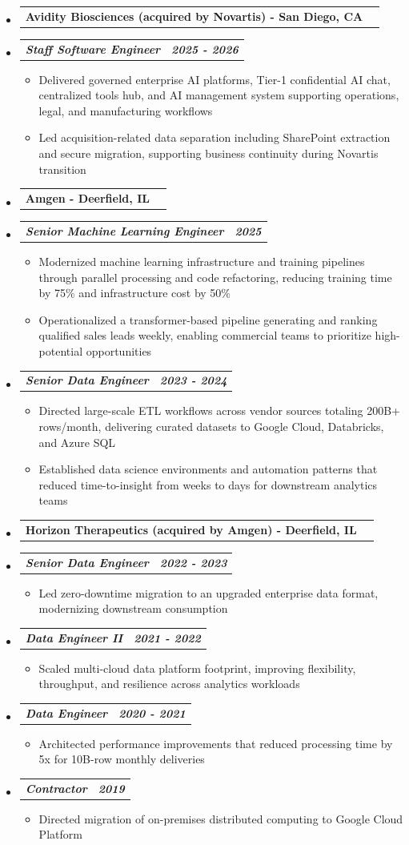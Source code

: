 \documentclass[letterpaper,11pt]{article}
\makeatletter
\newcommand{\resumeItem}[1]{
  \item\small{
    {#1 \vspace{0pt}}
  }
}
\newcommand{\resumeSubheading}[2]{
  \vspace{-1pt}\item
    \begin{tabular*}{0.97\textwidth}[t]{l@{\extracolsep{\fill}}r}
      \textbf{\small#1 - \small#2}
    \end{tabular*}\vspace{-4pt}
}
\newcommand{\resumeSubSubheading}[2]{
    \item
    \vspace{0pt}
    \begin{tabular*}{0.97\textwidth}{l@{\extracolsep{\fill}}r}
      \textbf{\textit{\small#1}} & \textbf{\textit{\small#2}} \\
    \end{tabular*}\vspace{-7pt}
}
\newcommand{\resumeHeadingListStart}{\begin{itemize}[leftmargin=0.05in, label={}, itemsep=0pt, topsep=0pt]}
\newcommand{\resumeHeadingListEnd}{\end{itemize}}
\newcommand{\resumeSubHeadingListStart}{\begin{itemize}[leftmargin=0.15in, label={}, itemsep=0pt, topsep=0pt]}
\newcommand{\resumeSubHeadingListEnd}{\end{itemize}\vspace{0pt}}
\newcommand{\resumeItemListStart}{\begin{itemize}[leftmargin=0.15in, itemsep=0pt, topsep=0pt]}
\newcommand{\resumeItemListEnd}{\end{itemize}\vspace{-4pt}}
\makeatother
\begin{document}
    \resumeHeadingListStart
        \resumeSubheading{Avidity Biosciences (acquired by Novartis)}{San Diego, CA}
    \resumeHeadingListEnd
        \resumeSubHeadingListStart
            \resumeSubSubheading {Staff Software Engineer}{2025 - 2026}
            \resumeItemListStart
                \resumeItem{Delivered governed enterprise AI platforms, Tier-1 confidential AI chat, centralized tools hub, and AI management system supporting operations, legal, and manufacturing workflows}
                \resumeItem{Led acquisition-related data separation including SharePoint extraction and secure migration, supporting business continuity during Novartis transition}
            \resumeItemListEnd
        \resumeSubHeadingListEnd

    \resumeHeadingListStart
        \resumeSubheading{Amgen}{Deerfield, IL}
    \resumeHeadingListEnd
        \resumeSubHeadingListStart
            \resumeSubSubheading {Senior Machine Learning Engineer}{2025}
            \resumeItemListStart
                \resumeItem{Modernized machine learning infrastructure and training pipelines through parallel processing and code refactoring, reducing training time by 75\% and infrastructure cost by 50\%}
                \resumeItem{Operationalized a transformer-based pipeline generating and ranking qualified sales leads weekly, enabling commercial teams to prioritize high-potential opportunities}
            \resumeItemListEnd
        \resumeSubHeadingListEnd

        \resumeSubHeadingListStart
            \resumeSubSubheading {Senior Data Engineer}{2023 - 2024}
            \resumeItemListStart
                \resumeItem{Directed large-scale ETL workflows across vendor sources totaling 200B+ rows/month, delivering curated datasets to Google Cloud, Databricks, and Azure SQL}
                \resumeItem{Established data science environments and automation patterns that reduced time-to-insight from weeks to days for downstream analytics teams}
            \resumeItemListEnd
        \resumeSubHeadingListEnd
    \resumeHeadingListStart
        \resumeSubheading{Horizon Therapeutics (acquired by Amgen)}{Deerfield, IL}
    \resumeHeadingListEnd
        \resumeSubHeadingListStart
            \resumeSubSubheading {Senior Data Engineer}{2022 - 2023}
            \resumeItemListStart
                \resumeItem{Led zero-downtime migration to an upgraded enterprise data format, modernizing downstream consumption}
            \resumeItemListEnd
            \resumeSubSubheading {Data Engineer II}{2021 - 2022}
            \resumeItemListStart
                \resumeItem{Scaled multi-cloud data platform footprint, improving flexibility, throughput, and resilience across analytics workloads}
            \resumeItemListEnd
            \resumeSubSubheading {Data Engineer}{2020 - 2021}
            \resumeItemListStart
                \resumeItem{Architected performance improvements that reduced processing time by 5x for 10B-row monthly deliveries}
            \resumeItemListEnd
            \resumeSubSubheading {Contractor}{2019}
            \resumeItemListStart
                \resumeItem{Directed migration of on-premises distributed computing to Google Cloud Platform}
            \resumeItemListEnd
        \resumeSubHeadingListEnd
\end{document}
